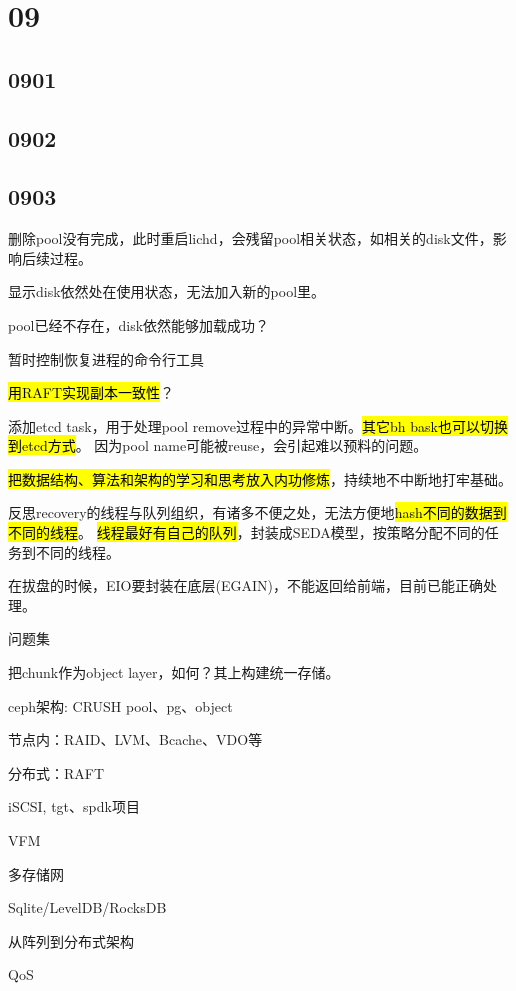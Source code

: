 \section{09}

\subsection{0901}

\subsection{0902}

\subsection{0903}

删除pool没有完成，此时重启lichd，会残留pool相关状态，如相关的disk文件，影响后续过程。

\begin{enumbox}
\item 显示disk依然处在使用状态，无法加入新的pool里。
\item pool已经不存在，disk依然能够加载成功？
\item 暂时控制恢复进程的命令行工具
\item \hl{用RAFT实现副本一致性}？
\end{enumbox}

添加etcd task，用于处理pool remove过程中的异常中断。\hl{其它bh bask也可以切换到etcd方式}。
因为pool name可能被reuse，会引起难以预料的问题。

\hl{把数据结构、算法和架构的学习和思考放入内功修炼}，持续地不中断地打牢基础。

反思recovery的线程与队列组织，有诸多不便之处，无法方便地\hl{hash不同的数据到不同的线程}。
\hl{线程最好有自己的队列}，封装成SEDA模型，按策略分配不同的任务到不同的线程。

在拔盘的时候，EIO要封装在底层(EGAIN)，不能返回给前端，目前已能正确处理。

问题集
\begin{enumbox}
\item 把chunk作为object layer，如何？其上构建统一存储。
\item ceph架构: CRUSH pool、pg、object
\item 节点内：RAID、LVM、Bcache、VDO等
\item 分布式：RAFT
\item iSCSI, tgt、spdk项目
\item VFM
\item 多存储网
\item Sqlite/LevelDB/RocksDB
\item 从阵列到分布式架构
\item QoS
\end{enumbox}

